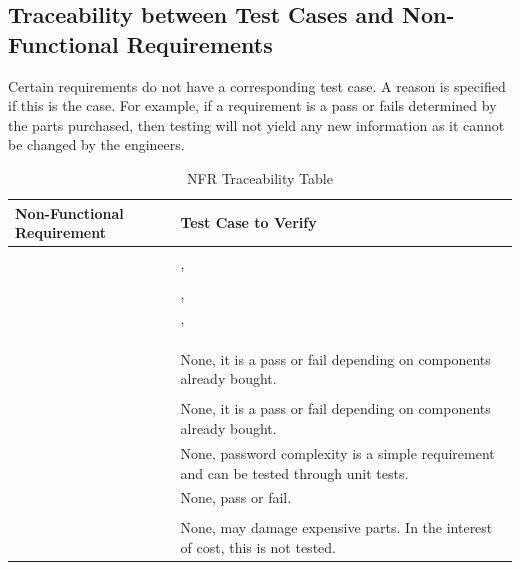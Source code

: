 \documentclass[12pt, titlepage]{article}
\begin{document}
\clearpage


\subsection{Traceability between Test Cases and Non-Functional Requirements}

Certain requirements do not have a corresponding test case. A reason is specified if this is the case. For example, if a requirement is a pass or fails determined by the parts purchased, then testing will not yield any new information as it cannot be changed by the engineers. 

\begin{table}[!h]
\begin{center}
\caption {NFR Traceability Table}
\label{tab:NFR_Trace}
\begin{tabular}{ | m{3cm} | m{12cm} | } 
\hline
Non-Functional Requirement & Test Case to Verify \\
\hline
\nameref{PERF_001} & \nameref{tab:STC_013} \\ \hline
\nameref{PERF_002} & \nameref{tab:STC_002}, \nameref{tab:STC_003} \\ \hline
\nameref{PERF_003} & \nameref{tab:STC_004} \\ \hline
\nameref{PERF_004} & \nameref{tab:STC_011}, \nameref{tab:STC_013} \\ \hline
\nameref{PERF_005} & \nameref{tab:STC_002}, \nameref{tab:STC_003} \\ \hline
\nameref{PERF_006} & \nameref{tab:STC_004} \\ \hline
\nameref{PERF_007} & \nameref{tab:STC_015} \\ \hline
\nameref{PERF_008} & \nameref{tab:STC_004} \\ \hline
\nameref{DES_001} & None, it is a pass or fail depending on components already bought. \\ \hline
\nameref{STD_001} & \nameref{tab:STC_019} \\ \hline
\nameref{STD_002} & None, it is a pass or fail depending on components already bought. \\ \hline
\nameref{SEC_001} & None, password complexity is a simple requirement and can be tested through unit tests.\\ \hline
\nameref{SEC_002} & None, pass or fail. \\ \hline
\nameref{MTNC_001} & \nameref{tab:STC_020} \\ \hline
\nameref{MTNC_002} & None, may damage expensive parts. In the interest of cost, this is not tested. \\ \hline

\end{tabular}
\end{center}
\end{table}
\end{document}
